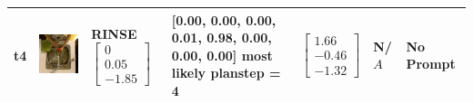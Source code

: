 \begin{longtable}{| V{0.8cm} | V{2.6cm} | V{1.6cm} | V{2.1cm} | V{1.55cm} | V{1.6cm} | V{3.2cm} |}
t4 &
\includegraphics[width=\linewidth]{fig/system/_slow2-rinse1_.jpg} &
RINSE
\linebreak\linebreak
$\begin{bmatrix}
0 \\
0.05 \\
-1.85
\end{bmatrix}$ &
[0.00, 0.00, 0.00, 0.01, 0.98, 0.00, 0.00, 0.00] most likely planstep = 4 &
$\begin{bmatrix}
1.66 \\
-0.46 \\
-1.32
\end{bmatrix}$ &
N/$A$ &
No Prompt
\\ \hline



\end{longtable}
